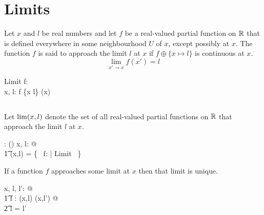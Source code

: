 \documentclass{amsart}
\begin{document}
\section{Limits}

Let $x$ and $l$ be real numbers and
let $f$ be a real-valued partial function on $\mathbb{R}$ that is defined everywhere in some
neighbourhood $U$ of $x$, except possibly at $x$.
The function $f$ is said to approach the limit $l$ at $x$ if $f \oplus \{ x \mapsto l \}$ is continuous at $x$.
$$
	\lim_{x' \to x}{f(x')} = l
$$

\begin{schema}{Limit}
	f: \R \pfun \R \\
	x, l: \R
\where
	f \oplus \{x \mapsto l\} \in \CzeroR(x)
\end{schema}

\subsection{}

Let $\operatorname{lim}(x,l)$ denote the set of all real-valued partial functions on $\mathbb{R}$ that approach the limit $l$ at $x$.

\begin{axdef}
	\limRR: \R \cross \R \fun \power(\R \pfun \R)
\where
	\forall x, l: \R @ \\
	\t1	\limRR(x,l) = \{~ f: \R \pfun \R | Limit ~\}
\end{axdef}

\begin{theorem}
If a function $f$ approaches some limit at $x$ then that limit is unique.
\begin{zed}
	\forall x, l, l': \R @ \\
	\t1	\forall f : \limRR(x,l) \cap \limRR(x,l') @ \\
	\t2		l = l'
\end{zed}
\end{theorem}
\end{document}

